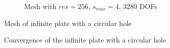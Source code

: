 \begin{figure}[H]\ContinuedFloat
    \begin{subfigure}[b]{1\linewidth}
        \centering
        \caption{Mesh with $res=256$, $s_{max}=4$, 3280 DOFs}
    \end{subfigure}
    \caption[Mesh of the infinite plate with a circular hole]{Mesh of infinite plate with a circular hole}
    \label{qdt_fig:ex_chole_mesh_all}
\end{figure}


\begin{figure}[H]
    \centering
    \caption[Convergence of the infinite plate with a circular hole]{Convergence of the infinite plate with a circular hole}
    \label{qdt_fig:ex_chole_mesh_conv}
\end{figure}

\pagebreak